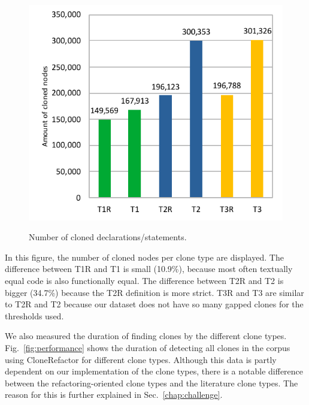 \documentclass[a4paper]{article}
\begin{document}
\begin{figure}[H]
  \caption{Number of cloned declarations/statements.}
    \includegraphics[width=1\columnwidth]{img/TypeResults}
  \label{fig:typeres}
\end{figure}

In this figure, the number of cloned nodes per clone type are displayed. The difference between T1R and T1 is small (10.9\%), because most often textually equal code is also functionally equal. The difference between T2R and T2 is bigger (34.7\%) because the T2R definition is more strict. T3R and T3 are similar to T2R and T2 because our dataset does not have so many gapped clones for the thresholds used.

We also measured the duration of finding clones by the different clone types. Fig.~\ref{fig:performance} shows the duration of detecting all clones in the corpus using CloneRefactor for different clone types. Although this data is partly dependent on our implementation of the clone types, there is a notable difference between the refactoring-oriented clone types and the literature clone types. The reason for this is further explained in Sec.~\ref{chap:challenge}.
\end{document}
